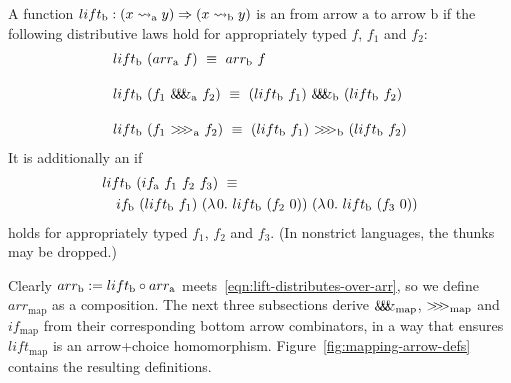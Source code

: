 \documentclass[preprint]{sigplanconf}
\newcommand{\arrow}{\rightsquigarrow}
\newcommand{\arrowlift}{\ensuremath{lift}}
\newcommand{\arrowarr}{\ensuremath{arr}}
\newcommand{\arrowcomp}{\ensuremath{{>}\mspace{-6mu}{>}\mspace{-6mu}{>}}}
\newcommand{\arrowpair}{\ensuremath{\mathit{\&\mspace{-7.5mu}\&\mspace{-7.5mu}\&}}}
\newcommand{\arrowif}{\ensuremath{if}}
\newcommand{\map}{_\mathrm{map}}
\newcommand{\liftmap}{\arrowlift\map}
\newcommand{\arrmap}{\arrowarr\map}
\newcommand{\compmap}{\arrowcomp\map}
\newcommand{\pairmap}{\arrowpair\map}
\newcommand{\ifmap}{\arrowif\map}
\begin{document}
\begin{definition}
A function $lift\genb : (x \arrow\gen y) \tto (x \arrow\genb y)$ is an  from arrow $\mathrm{a}$ to arrow $\mathrm{b}$ if the following distributive laws hold for appropriately typed $f$, $f_1$ and $f_2$:
\begin{align}
	&\begin{aligned}
		lift\genb~(\arrowarr\gen~f) \ \equiv \ \arrowarr\genb~f
	\label{eqn:lift-distributes-over-arr}
	\end{aligned} \\
\nonumber \\[-6pt]
	&\begin{aligned}
		lift\genb~(f_1~\arrowpair\gen~f_2) \ \equiv \ (lift\genb~f_1)~\arrowpair\genb~(lift\genb~f_2)
	\label{eqn:lift-distributes-over-pair}
	\end{aligned} \\
\nonumber \\[-6pt]
	&\begin{aligned}
		lift\genb~(f_1~\arrowcomp\gen~f_2) \ \equiv \ (lift\genb~f_1)~\arrowcomp\genb~(lift\genb~f_2)
	\label{eqn:lift-distributes-over-comp}
	\end{aligned}
\end{align}
It is additionally an  if
\begin{equation}
\begin{aligned}
	&lift\genb~(\arrowif\gen~f_1~f_2~f_3) \ \equiv \ \\
	&\tab\arrowif\genb~(lift\genb~f_1)~(\fun{0}{lift\genb~(f_2~0)})~(\fun{0}{lift\genb~(f_3~0)})
\label{eqn:lift-distributes-over-if}
\end{aligned}
\end{equation}
holds for appropriately typed $f_1$, $f_2$ and $f_3$.
(In nonstrict languages, the thunks may be dropped.)
\label{def:arrow-homomorphism}
\end{definition}

Clearly $\arrowarr\genb := lift\genb \circ \arrowarr\gen$ meets~\eqref{eqn:lift-distributes-over-arr}, so we define $\arrmap$ as a composition.
The next three subsections derive $\pairmap$, $\compmap$ and $\ifmap$ from their corresponding bottom arrow combinators, in a way that ensures $\liftmap$ is an arrow+choice homomorphism.
Figure~\ref{fig:mapping-arrow-defs} contains the resulting definitions.
\end{document}
